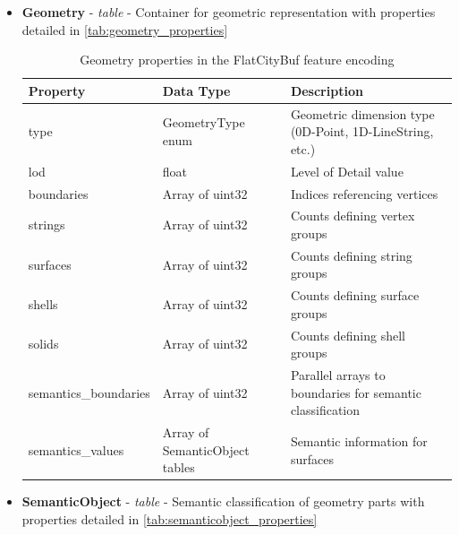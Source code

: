 \begin{itemize}
  \item \textbf{Geometry} - \textit{table} - Container for geometric representation with properties detailed in \autoref{tab:geometry_properties}

    \begin{table}[h]
      \centering
      \caption{Geometry properties in the FlatCityBuf feature encoding}
      \label{tab:geometry_properties}
      \small
      \begin{tabularx}{\textwidth}{@{}llX@{}}
        \toprule
        \textbf{Property} & \textbf{Data Type} & \textbf{Description} \\
        \midrule
        type & GeometryType enum & Geometric dimension type (0D-Point, 1D-LineString, etc.) \\
        lod & float & Level of Detail value \\
        boundaries & Array of uint32 & Indices referencing vertices \\
        strings & Array of uint32 & Counts defining vertex groups \\
        surfaces & Array of uint32 & Counts defining string groups \\
        shells & Array of uint32 & Counts defining surface groups \\
        solids & Array of uint32 & Counts defining shell groups \\
        semantics\_boundaries & Array of uint32 & Parallel arrays to boundaries for semantic classification \\
        semantics\_values & Array of SemanticObject tables & Semantic information for surfaces \\
        \bottomrule
      \end{tabularx}
    \end{table}

  \item \textbf{SemanticObject} - \textit{table} - Semantic classification of geometry parts with properties detailed in \autoref{tab:semanticobject_properties}


\end{itemize}
